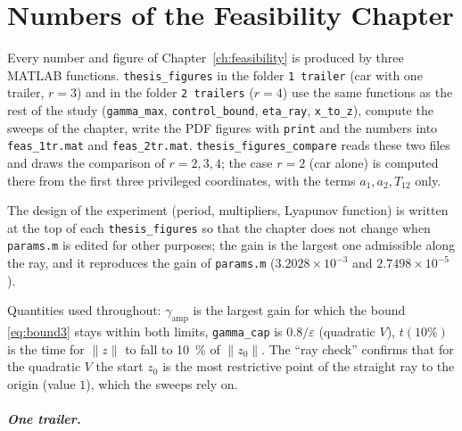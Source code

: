 
\chapter{Numbers of the Feasibility Chapter}
\label{app:feasibility}

Every number and figure of Chapter~\ref{ch:feasibility} is produced by three MATLAB
functions. \texttt{thesis\_figures} in the folder \texttt{1 trailer} (car with one
trailer, $r=3$) and in the folder \texttt{2 trailers} ($r=4$) use the same functions as
the rest of the study (\texttt{gamma\_max}, \texttt{control\_bound}, \texttt{eta\_ray},
\texttt{x\_to\_z}), compute the sweeps of the chapter, write the PDF figures with
\texttt{print} and the numbers into \texttt{feas\_1tr.mat} and \texttt{feas\_2tr.mat}.
\texttt{thesis\_figures\_compare} reads these two files and draws the comparison of
$r=2,3,4$; the case $r=2$ (car alone) is computed there from the first three
privileged coordinates, with the terms $a_1,a_2,T_{12}$ only.

The design of the experiment (period, multipliers, Lyapunov function) is written at the top of each
\texttt{thesis\_figures} so that the chapter does not change when \texttt{params.m} is edited for
other purposes; the gain is the largest one admissible along the ray, and it reproduces the gain
of \texttt{params.m} ($3.2028\times10^{-3}$ and $2.7498\times10^{-5}$).

Quantities used throughout: $\gamma_{\mathrm{amp}}$ is the largest gain for which the
bound \eqref{eq:bound3} stays within both limits, \texttt{gamma\_cap} is $0.8/\varepsilon$
(quadratic $V$), $t(10\%)$ is the time for $\|z\|$ to fall to \SI{10}{\percent} of
$\|z_0\|$. The ``ray check'' confirms that for the quadratic $V$ the start $z_0$ is the
most restrictive point of the straight ray to the origin (value $1$), which the sweeps
rely on.

\paragraph{One trailer.}

